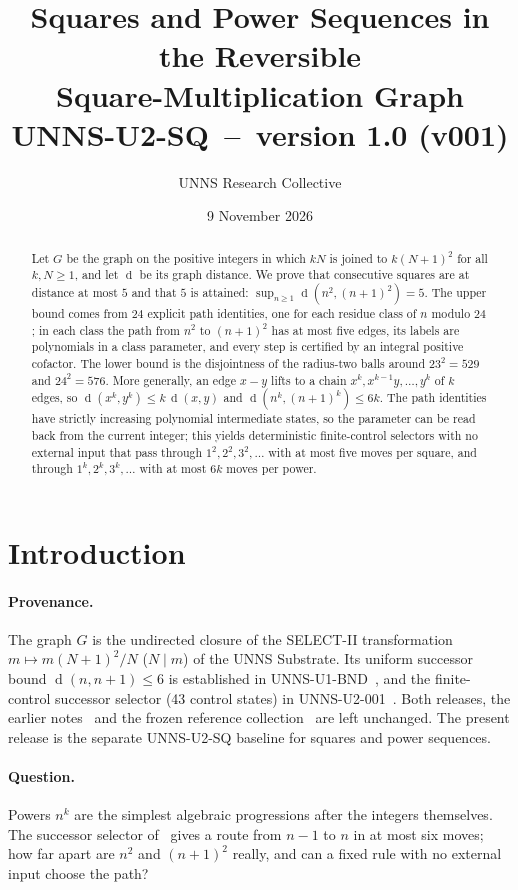 \documentclass[11pt]{article}
\title{\textbf{Squares and Power Sequences in the Reversible\\ Square-Multiplication Graph}\\[4pt]
\large UNNS-U2-SQ \,--\, version 1.0 (v001)}
\author{UNNS Research Collective}
\date{9 November 2026}
\theoremstyle{definition}
\newcommand{\dist}{\operatorname{d}}
\begin{document}
\maketitle

\begin{abstract}
\noindent Let $G$ be the graph on the positive integers in which $kN$ is joined to $k(N+1)^2$ for all $k,N\ge1$, and let $\dist$ be its graph distance.
We prove that consecutive squares are at distance at most $5$ and that $5$ is attained:
$\sup_{n\ge1}\dist(n^2,(n+1)^2)=5$. The upper bound comes from $24$ explicit path identities, one for each residue class of $n$ modulo $24$; in each class
the path from $n^2$ to $(n+1)^2$ has at most five edges, its labels are polynomials in a class parameter, and every step is certified by an integral positive cofactor.
The lower bound is the disjointness of the radius-two balls around $23^2=529$ and $24^2=576$. More generally, an edge $x\!-\!y$ lifts to a chain
$x^k,x^{k-1}y,\dots,y^k$ of $k$ edges, so $\dist(x^k,y^k)\le k\,\dist(x,y)$ and $\dist(n^k,(n+1)^k)\le 6k$. The path identities have strictly increasing polynomial intermediate states,
so the parameter can be read back from the current integer; this yields deterministic finite-control selectors with no external input that pass through
$1^2,2^2,3^2,\dots$ with at most five moves per square, and through $1^k,2^k,3^k,\dots$ with at most $6k$ moves per power.
\end{abstract}

\section{Introduction}\label{sec:intro}
\paragraph{Provenance.} The graph $G$ is the undirected closure of the SELECT-II transformation $m\mapsto m(N+1)^2/N$ ($N\mid m$) of the UNNS Substrate.
Its uniform successor bound $\dist(n,n+1)\le6$ is established in UNNS-U1-BND~\cite{u1bnd}, and the finite-control successor selector (43 control states)
in UNNS-U2-001~\cite{u2}. Both releases, the earlier notes~\cite{u0,u1} and the frozen reference collection~\cite{gig,repo} are left unchanged. The present release is the
separate UNNS-U2-SQ baseline for squares and power sequences.

\paragraph{Question.} Powers $n^k$ are the simplest algebraic progressions after the integers themselves. The successor selector of~\cite{u2} gives a route from $n-1$ to $n$
in at most six moves; how far apart are $n^2$ and $(n+1)^2$ really, and can a fixed rule with no external input choose the path?
\end{document}
